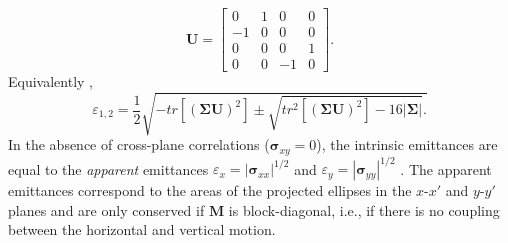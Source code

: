 %
\begin{equation}
    \mathbf{U} = 
    \begin{bmatrix}
        0 & 1 & 0 & 0 \\
        -1 & 0 & 0 & 0 \\
        0 & 0 & 0 & 1 \\
        0 & 0 & -1 & 0
    \end{bmatrix}.
\end{equation}
%
Equivalently \cite{Xiao2013},
%
\begin{equation}
    \varepsilon_{1, 2} = \frac{1}{2}\sqrt{
      -tr\left[(\bm{\Sigma} \mathbf{U})^2\right] \pm \sqrt{tr^2\left[(\bm{\Sigma} \mathbf{U})^2\right] - 16|{\bm{\Sigma}}|}.
    }
\end{equation}
%
In the absence of cross-plane correlations ($\bm{\sigma}_{xy} = 0$), the intrinsic emittances are equal to the \textit{apparent} emittances $\varepsilon_x = \left|{\bm\sigma}_{xx}\right|^{1/2}$ and $\varepsilon_y = \left|{\bm\sigma}_{yy}\right|^{1/2}$ \cite{Buon1993}. The apparent emittances correspond to the areas of the projected ellipses in the $x$-$x'$ and $y$-$y'$ planes and are only conserved if $\mathbf{M}$ is block-diagonal, i.e., if there is no coupling between the horizontal and vertical motion. 

